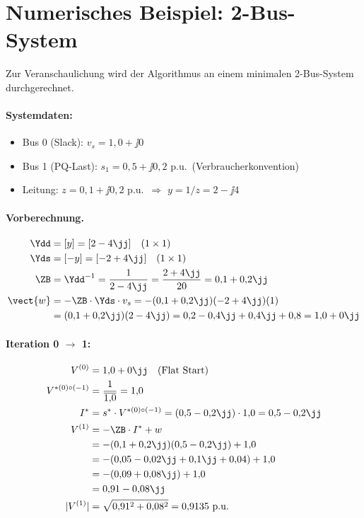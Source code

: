 \section{Numerisches Beispiel: 2-Bus-System}
\label{sec:beispiel_2bus}

Zur Veranschaulichung wird der Algorithmus an einem minimalen 2-Bus-System durchgerechnet.

\paragraph{Systemdaten:}
\begin{itemize}
	\item Bus 0 (Slack): $v_s = 1{,}0 + \jj 0$
	\item Bus 1 (PQ-Last): $s_1 = 0{,}5 + \jj 0{,}2$ p.u.\ (Verbraucherkonvention)
	\item Leitung: $z = 0{,}1 + \jj 0{,}2$ p.u.\ $\Rightarrow$ $y = 1/z = 2 - \jj 4$
\end{itemize}

\paragraph{Vorberechnung.}
\begin{align}
	\Ydd &= [y] = [2 - 4\jj] \quad (1 \times 1) \\
	\Yds &= [-y] = [-2 + 4\jj] \quad (1 \times 1) \\
	\ZB &= \Ydd^{-1} = \frac{1}{2 - 4\jj} = \frac{2 + 4\jj}{20} = 0{,}1 + 0{,}2\jj \\
	\vect{w} &= -\ZB \cdot \Yds \cdot v_s = -(0{,}1 + 0{,}2\jj)(-2 + 4\jj)(1) \\
	&= (0{,}1 + 0{,}2\jj)(2 - 4\jj) = 0{,}2 - 0{,}4\jj + 0{,}4\jj + 0{,}8 = 1{,}0 + 0\jj
\end{align}

\paragraph{Iteration 0 $\to$ 1:}
\begin{align}
	V^{(0)} &= 1{,}0 + 0\jj \quad \text{(Flat Start)} \\
	V^{*(0)\circ(-1)} &= \frac{1}{\overline{1{,}0}} = 1{,}0 \\
	I^* &= s^* \cdot V^{*(0)\circ(-1)} = (0{,}5 - 0{,}2\jj) \cdot 1{,}0 = 0{,}5 - 0{,}2\jj \\
	V^{(1)} &= -\ZB \cdot I^* + w \\
	&= -(0{,}1 + 0{,}2\jj)(0{,}5 - 0{,}2\jj) + 1{,}0 \\
	&= -(0{,}05 - 0{,}02\jj + 0{,}1\jj + 0{,}04) + 1{,}0 \\
	&= -(0{,}09 + 0{,}08\jj) + 1{,}0 \\
	&= 0{,}91 - 0{,}08\jj \\
	|V^{(1)}| &= \sqrt{0{,}91^2 + 0{,}08^2} = 0{,}9135 \text{ p.u.}
\end{align}

